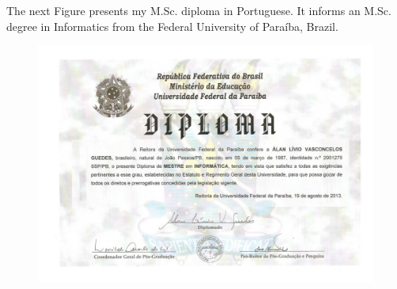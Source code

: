 \documentclass[10pt,a4paper,sans,colorlinks]{moderncv}
\begin{document}
The next Figure presents my M.Sc. diploma in Portuguese.
It informs an M.Sc. degree in Informatics from the Federal University of Paraíba, Brazil.

\begin{figure}
    \centering
    \includegraphics[align=t,width=\textwidth, keepaspectratio=true]{certificates/msc-diploma.pdf}
\end{figure}

\newpage
\end{document}
